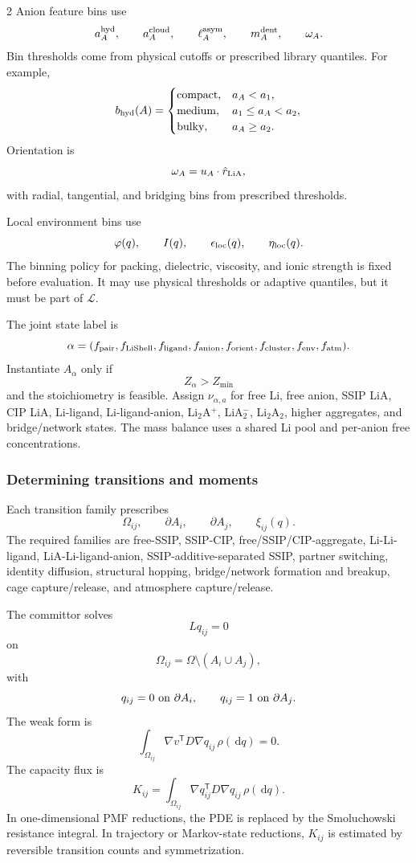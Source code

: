 \documentclass[10pt]{article}
\newcommand{\dd}{\,\mathrm d}
\newcommand{\T}{\mathsf{T}}
\begin{document}
\begin{multicols}{2}
Anion feature bins use
\[
a_A^{\rm hyd},\qquad
a_A^{\rm cloud},\qquad
\ell_A^{\rm asym},\qquad
m_A^{\rm dent},\qquad
\omega_A.
\]
Bin thresholds come from physical cutoffs or prescribed library quantiles. For
example,
\[
b_{\rm hyd}(A)=
\begin{cases}
{\rm compact}, & a_A<a_1,\\
{\rm medium}, & a_1\le a_A<a_2,\\
{\rm bulky}, & a_A\ge a_2.
\end{cases}
\]
Orientation is
\[
\omega_A=u_A\cdot\hat r_{\rm LiA},
\]
with radial, tangential, and bridging bins from prescribed thresholds.

Local environment bins use
\[
\varphi(q),\qquad I(q),\qquad \epsilon_{\rm loc}(q),\qquad \eta_{\rm loc}(q).
\]
The binning policy for packing, dielectric, viscosity, and ionic strength is
fixed before evaluation. It may use physical thresholds or adaptive quantiles,
but it must be part of \(\mathcal L\).

The joint state label is
\[
\alpha=
(f_{\rm pair},f_{\rm LiShell},f_{\rm ligand},f_{\rm anion},
f_{\rm orient},f_{\rm cluster},f_{\rm env},f_{\rm atm}).
\]
Instantiate \(A_\alpha\) only if
\[
Z_\alpha>Z_{\min}
\]
and the stoichiometry is feasible. Assign \(\nu_{\alpha,a}\) for free Li, free
anion, SSIP LiA, CIP LiA, Li-ligand, Li-ligand-anion, Li\(_2\)A\(^+\),
LiA\(_2^-\), Li\(_2\)A\(_2\), higher aggregates, and bridge/network states.
The mass balance uses a shared Li pool and per-anion free concentrations.

\subsubsection{Determining transitions and moments}

Each transition family prescribes
\[
\Omega_{ij},\qquad \partial A_i,\qquad \partial A_j,\qquad \xi_{ij}(q).
\]
The required families are free-SSIP, SSIP-CIP, free/SSIP/CIP-aggregate,
Li-Li-ligand, LiA-Li-ligand-anion, SSIP-additive-separated SSIP, partner
switching, identity diffusion, structural hopping, bridge/network formation and
breakup, cage capture/release, and atmosphere capture/release.

The committor solves
\[
Lq_{ij}=0
\]
on
\[
\Omega_{ij}=\Omega\setminus(A_i\cup A_j),
\]
with
\[
q_{ij}=0\ {\rm on}\ \partial A_i,
\qquad
q_{ij}=1\ {\rm on}\ \partial A_j.
\]
The weak form is
\[
\int_{\Omega_{ij}}
\nabla v^\T D\nabla q_{ij}\,\rho(\dd q)=0.
\]
The capacity flux is
\[
K_{ij}
=
\int_{\Omega_{ij}}
\nabla q_{ij}^\T D\nabla q_{ij}\,\rho(\dd q).
\]
In one-dimensional PMF reductions, the PDE is replaced by the Smoluchowski
resistance integral. In trajectory or Markov-state reductions, \(K_{ij}\) is
estimated by reversible transition counts and symmetrization.


\end{multicols}
\end{document}

